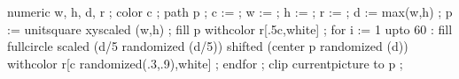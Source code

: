 
\unprotect



  numeric w, h, d, r ; color c ; path p ;
  c :=  ;
  w :=  ;
  h :=  ;
  r :=  ;
  d := max(w,h) ;
  p := unitsquare xyscaled (w,h) ;
  fill p withcolor r[.5c,white] ;
  for i := 1 upto 60 :
    fill fullcircle
      scaled (d/5 randomized (d/5))
      shifted (center p randomized (d))
      withcolor r[c randomized(.3,.9),white] ;
  endfor ;
  clip currentpicture to p ;
\stopuseMPgraphic


\newcounter\figurereplacementcycle

\setupexternalfigures
  [\c!reductie=0,
   \c!tekst=\v!ja]

